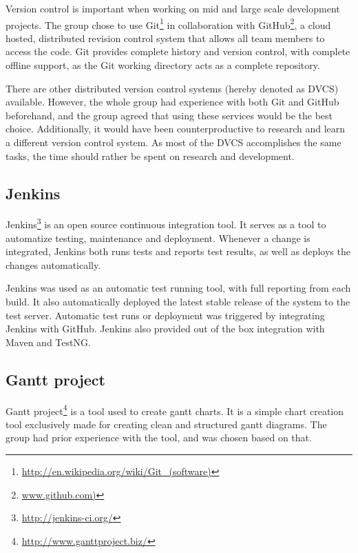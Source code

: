 Version control is important when working on mid and large scale development projects. The group chose to use Git\footnote{\url{http://en.wikipedia.org/wiki/Git_(software)}} in collaboration with GitHub\footnote{\url{www.github.com)}}, a cloud hosted, distributed revision control system that allows all team members to access the code. Git provides complete history and version control, with complete offline support, as the Git working directory acts as a complete repository.

There are other distributed version control systems (hereby denoted as DVCS) available. However, the whole group had experience with both Git and GitHub beforehand, and the group agreed that using these services would be the best choice. Additionally, it would have been counterproductive to research and learn a different version control system. As most of the DVCS accomplishes the same tasks, the time should rather be spent on research and development.

\subsection{Jenkins}
\label{subsec:prestudies-tools-jenkins}

Jenkins\footnote{\url{http://jenkins-ci.org/}} is an open source continuous integration tool. It serves as a tool to automatize testing, maintenance and deployment. Whenever a change is integrated, Jenkins both runs tests and reports test results, as well as deploys the changes automatically.

Jenkins was used as an automatic test running tool, with full reporting from each build. It also automatically deployed the latest stable release of the system to the test server. Automatic test runs or deployment was triggered by integrating Jenkins with GitHub. Jenkins also provided out of the box integration with Maven and TestNG.

\subsection{Gantt project}
\label{subsec:prestudies-tools-gantt_project}

Gantt project\footnote{\url{http://www.ganttproject.biz/}} is a tool used to create gantt charts. It is a simple chart creation tool exclusively made for creating clean and structured gantt diagrams. The group had prior experience with the tool, and was chosen based on that.

